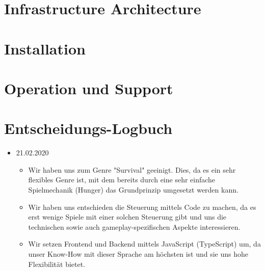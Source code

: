 \documentclass[a4paper, 11pt]{scrartcl}
\let\oldsection\section
\renewcommand\section{\clearpage\oldsection}
\begin{document}
\section{Infrastructure Architecture}

\section{Installation}

\section{Operation und Support}

\section{Entscheidungs-Logbuch}

\begin{itemize}
  \item 21.02.2020
  \begin{itemize}
    \item Wir haben uns zum Genre "Survival" geeinigt. Dies, da es ein sehr flexibles Genre ist, mit dem bereits durch eine sehr einfache Spielmechanik (Hunger) das Grundprinzip umgesetzt werden kann.
    \item Wir haben uns entschieden die Steuerung mittels Code zu machen, da es erst wenige Spiele mit einer solchen Steuerung gibt und uns die technischen sowie auch gameplay-spezifischen Aspekte interessieren.
    \item Wir setzen Frontend und Backend mittels JavaScript (TypeScript) um, da unser Know-How mit dieser Sprache am höchsten ist und sie uns hohe Flexibilität bietet.
  \end{itemize}
\end{itemize}

\clearpage

\printglossary[type=\acronymtype]

\printglossary
\end{document}
